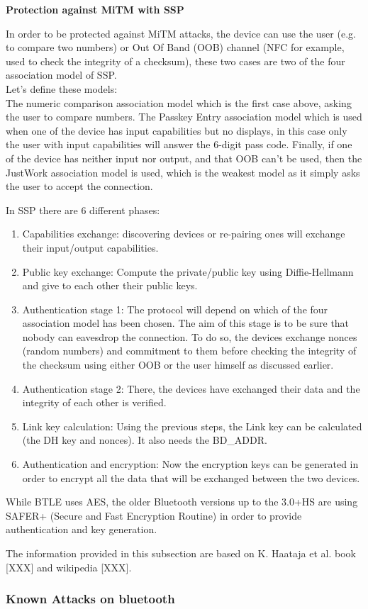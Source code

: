 \textbf{Protection against MiTM with SSP}

In order to be protected against MiTM attacks, the device can use the user (e.g. to compare two numbers) or Out Of Band (OOB) channel (NFC for example, used to check the integrity of a checksum), these two cases are two of the four association model of SSP. \\ 
Let's define these models:\\
The numeric comparison association model which is the first case above, asking the user to compare numbers. The Passkey Entry association model which is used when one of the device has input capabilities but no displays, in this case only the user with input capabilities will answer the 6-digit pass code.
Finally, if one of the device has neither input nor output, and that OOB can't be used, then the JustWork association model is used, which is the weakest model as it simply asks the user to accept the connection. 

In SSP there are 6 different phases:
\begin{enumerate}
	\item Capabilities exchange: discovering devices or re-pairing ones will exchange their input/output capabilities.
	\item Public key exchange: Compute the private/public key using Diffie-Hellmann and give to each other their public keys. 
	\item Authentication stage 1: The protocol will depend on which of the four association model has been chosen. The aim of this stage is to be sure that nobody can eavesdrop the connection. To do so, the devices exchange nonces (random numbers) and commitment to them before checking the integrity of the checksum using either OOB or the user himself as discussed earlier. 	
	\item Authentication stage 2: There, the devices have exchanged their data and the integrity of each other is verified.
	\item Link key calculation: Using the previous steps, the Link key can be calculated (the DH key and nonces). It also needs the BD\_ADDR.
	\item Authentication and encryption: Now the encryption keys can be generated in order to encrypt all the data that will be exchanged between the two devices. 
\end{enumerate}
 
While BTLE uses AES, the older Bluetooth versions up to the 3.0+HS are using SAFER+ (Secure and Fast Encryption Routine) in order to provide authentication and key generation.

The information provided in this subsection are based on K. Haataja et al. book [XXX] and wikipedia [XXX].

\subsubsection{Known Attacks on bluetooth}
















